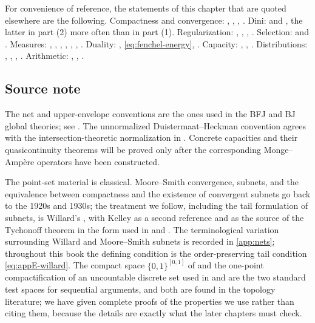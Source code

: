 For convenience of reference, the statements of this chapter that are quoted
elsewhere are the following.  Compactness and convergence:
, ,
, .  Dini:
 and , the latter in part (2) more
often than in part (1).  Regularization:
, ,
, .  Selection:
 and .  Measures:
, ,
, ,
, ,
.  Duality:
, \eqref{eq:fenchel-energy},
.  Capacity:
, ,
.  Distributions:
, ,
, .  Arithmetic:
, ,
.

\subsection*{Source note}

The net and upper-envelope conventions are the ones used in the BFJ and BJ
global theories; see \cite{BFJ16,BJ22}.  The unnormalized
Duistermaat--Heckman convention agrees with the intersection-theoretic
normalization in \cite{BHJ17}.  Concrete capacities and their
quasicontinuity theorems will be proved only after the corresponding
Monge--Amp\`ere operators have been constructed.

The point-set material is classical.  Moore--Smith convergence, subnets, and
the equivalence between compactness and the existence of convergent subnets go
back to the 1920s and 1930s; the treatment we follow, including the tail
formulation of subnets, is Willard's \cite[Chapters~4--5]{Wil70}, with
Kelley \cite{Kel75} as a second reference and as the source of the Tychonoff
theorem in the form used in  and
.  The terminological variation surrounding
Willard and Moore--Smith subnets is recorded in \cref{app:nets}; throughout
this book the defining condition is the order-preserving tail condition
\eqref{eq:appE-willard}.  The compact space
$\{0,1\}^{[0,1]}$ of  and the one-point
compactification of an uncountable discrete set used in
 and
 are the two standard test spaces for
sequential arguments, and both are found in the topology literature; we have
given complete proofs of the properties we use rather than citing them,
because the details are exactly what the later chapters must check.

